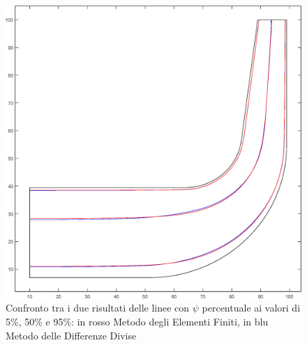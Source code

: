 \documentclass{tufte-handout}
\begin{document}
\begin{figure}
    \centering
    \includegraphics{fem_fdm_match.eps}
    \caption{Confronto tra i due risultati delle linee con $\psi$ percentuale ai valori di 5\%, 50\% e 95\%: in rosso Metodo degli Elementi Finiti, in blu Metodo delle Differenze Divise}
    \label{fig:match}
\end{figure}
\end{document}
